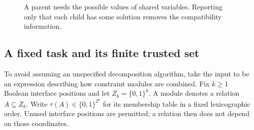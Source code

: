 \documentclass[11pt,twoside]{article}
\theoremstyle{definition}
\theoremstyle{remark}
\begin{document}
\begin{figure}[htbp]
\centering
{}
\caption{A parent needs the possible values of shared variables. Reporting
only that each child has some solution removes the compatibility information.}
\label{fig:constraints}
\end{figure}

\subsection{A fixed task and its finite trusted set}

To avoid assuming an unspecified decomposition algorithm, take the input
to be an expression describing how constraint modules are combined. Fix
$k\geq1$ Boolean interface positions and let
$Z_k=\{0,1\}^k$. A module denotes a relation $A\subseteq Z_k$.
Write $\tau(A)\in\{0,1\}^{2^k}$ for its membership table in a fixed
lexicographic order. Unused interface positions are permitted; a relation
then does not depend on those coordinates.
\end{document}
